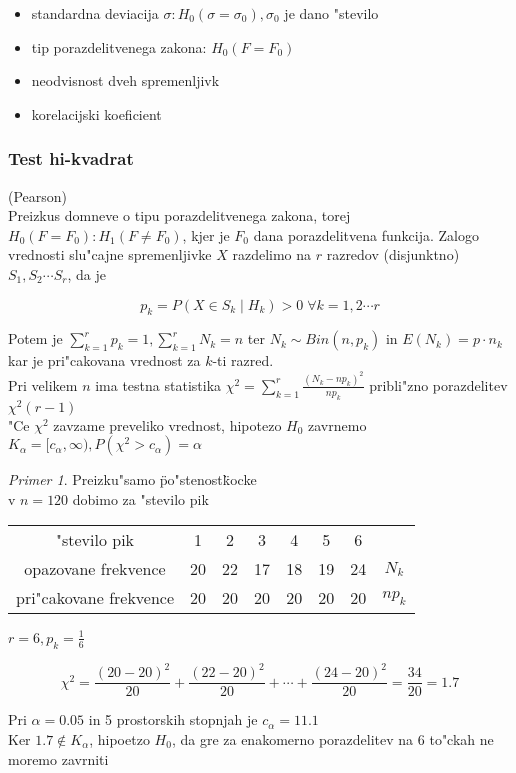 \documentclass[a4paper,12pt]{article}
\theoremstyle{definition}
\theoremstyle{remark}
\newtheorem*{ex}{Primer}
\begin{document}
\begin{itemize}
    \item standardna deviacija $\sigma: H_0(\sigma = \sigma_0), \sigma_0$ je dano "stevilo
    \item tip porazdelitvenega zakona: $H_0(F = F_0)$
    \item neodvisnost dveh spremenljivk
    \item korelacijski koeficient
\end{itemize}

\subsubsection{Test hi-kvadrat}

(Pearson) \\
Preizkus domneve o tipu porazdelitvenega zakona, torej $H_0(F = F_0) : H_1(F \neq F_0)$, kjer je $F_0$ dana
porazdelitvena funkcija. Zalogo vrednosti slu"cajne spremenljivke $X$ razdelimo na $r$ razredov (disjunktno)
$S_1, S_2 \cdots S_r$, da je

\begin{equation*}
    p_k = P(X \in S_k \mid H_k) > 0 \; \forall k = 1, 2 \cdots r
\end{equation*}

Potem je $\sum_{k=1}^{r} p_k = 1, \sum_{k=1}^{r} N_k = n$ ter $N_k \sim Bin(n, p_k)$ in $E(N_k) = p \cdot n_k$
kar je pri"cakovana vrednost za $k$-ti razred. \\
Pri velikem $n$ ima testna statistika $\chi^2 = \sum_{k=1}^{r} \frac{(N_k - n p_k)^2}{n p_k}$ pribli"zno
porazdelitev $\chi^2(r-1)$ \\
"Ce $\chi^2$ zavzame preveliko vrednost, hipotezo $H_0$ zavrnemo \\
$K_{\alpha} = [c_{\alpha}, \infty), P(\chi^2 > c_{\alpha}) = \alpha$

\begin{ex}
    Preizku"samo \"po"stenost\" kocke \\
    v $n=120$ dobimo za "stevilo pik

    \begin{center}
        \begin{tabular}{ c c c c c c c c}
            "stevilo pik & 1 & 2 & 3 & 4 & 5 & 6 & \\
            opazovane frekvence & 20 & 22 & 17 & 18 & 19 & 24 & $N_k$ \\
            pri"cakovane frekvence & 20 & 20 & 20 & 20 & 20 & 20 & $n p_k$
            \end{tabular}
    \end{center}

    $r = 6, p_k = \frac{1}{6}$

    \begin{equation*}
        \chi^2 = \frac{(20-20)^2}{20} + \frac{(22-20)^2}{20} + \cdots + \frac{(24-20)^2}{20} = \frac{34}{20} = 1.7
    \end{equation*}

    Pri $\alpha = 0.05$ in 5 prostorskih stopnjah je $c_{\alpha} = 11.1$ \\
    Ker $1.7 \notin K_{\alpha}$, hipoetzo $H_0$, da gre za enakomerno porazdelitev na 6 to"ckah ne moremo zavrniti
\end{ex}
\end{document}
